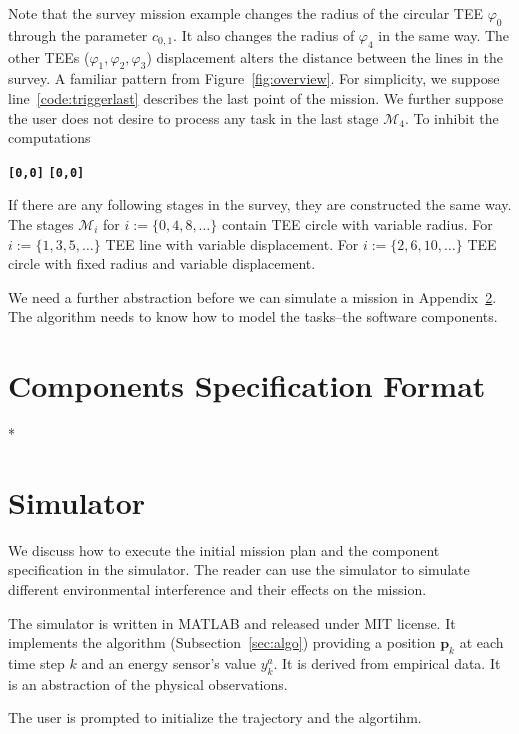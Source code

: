 \documentclass[letterpaper,10pt,conference]{ieeeconf}
\theoremstyle{definition}
\begin{document}
Note that the survey mission example changes the radius of the circular TEE $\varphi_0$ through the parameter $c_{0,1}$. It also changes the radius of $\varphi_4$ in the same way. The other TEEs ($\varphi_1,\varphi_2,\varphi_3$) displacement alters the distance between the lines in the survey. A familiar pattern from Figure~\ref{fig:overview}. For simplicity, we suppose line~\ref{code:triggerlast} describes the last point of the mission. We further suppose the user does not desire to process any task in the last stage $\mathcal{M}_4$. To inhibit the computations
\begin{algorithmic}[1]
  \State\textbf{\texttt{[0,0]}}
  \State\textbf{\texttt{[0,0]}}
\end{algorithmic}

If there are any following stages in the survey, they are constructed the same way. The stages $\mathcal{M}_i$ for $i:=\{0,4,8,\dots\}$ contain TEE circle with variable radius. For $i:=\{1,3,5,\dots\}$ TEE line with variable displacement. For $i:=\{2,6,10,\dots\}$ TEE circle with fixed radius and variable displacement.

We need a further abstraction before we can simulate a mission in Appendix~\ref{app:simulator}. The algorithm needs to know how to model the tasks--the software components.

\section{Components Specification Format}

*

\section{Simulator}
\label{app:simulator}

We discuss how to execute the initial mission plan and the component specification in the simulator. The reader can use the simulator to simulate different environmental interference and their effects on the mission.

The simulator is written in MATLAB and released under MIT license. It implements the algorithm (Subsection~\ref{sec:algo}) providing a position $\mathbf{p}_k$ at each time step $k$ and an energy sensor's value $y_k^a$. It is derived from empirical data. It is an abstraction of the physical observations. 

The user is prompted to initialize the trajectory and the algortihm.
\end{document}
